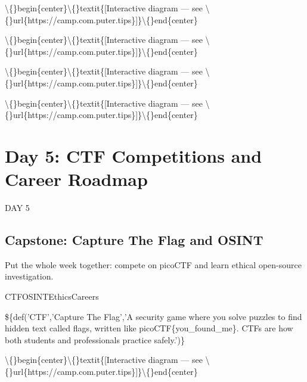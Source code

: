 \documentclass[12pt,openany]{book}
\begin{document}
\textbackslash\{\}begin\{center\}\textbackslash\{\}textit\{[Interactive diagram --- see \textbackslash\{\}url\{https://camp.com.puter.tips\}]\}\textbackslash\{\}end\{center\}



\textbackslash\{\}begin\{center\}\textbackslash\{\}textit\{[Interactive diagram --- see \textbackslash\{\}url\{https://camp.com.puter.tips\}]\}\textbackslash\{\}end\{center\}









\textbackslash\{\}begin\{center\}\textbackslash\{\}textit\{[Interactive diagram --- see \textbackslash\{\}url\{https://camp.com.puter.tips\}]\}\textbackslash\{\}end\{center\}









\textbackslash\{\}begin\{center\}\textbackslash\{\}textit\{[Interactive diagram --- see \textbackslash\{\}url\{https://camp.com.puter.tips\}]\}\textbackslash\{\}end\{center\}









\chapter{Day 5: CTF Competitions and Career Roadmap}
DAY 5


\section*{Capstone: Capture The Flag and OSINT}


Put the whole week together: compete on picoCTF and learn ethical open-source investigation.


CTFOSINTEthicsCareers







\$\{def('CTF','Capture The Flag','A security game where you solve puzzles to find hidden text called flags, written like picoCTF\{you\_found\_me\}. CTFs are how both students and professionals practice safely.')\}



\textbackslash\{\}begin\{center\}\textbackslash\{\}textit\{[Interactive diagram --- see \textbackslash\{\}url\{https://camp.com.puter.tips\}]\}\textbackslash\{\}end\{center\}
\end{document}
